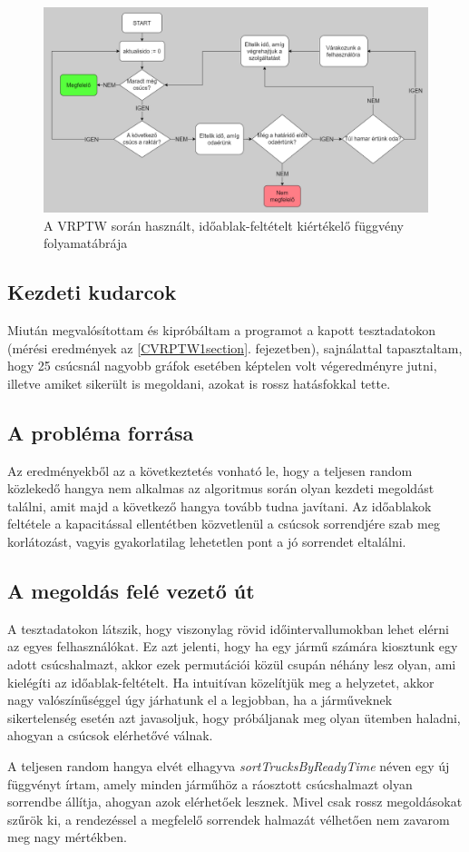\begin{figure}[ht!]
	\centering
	\includegraphics[width=150mm, keepaspectratio]{figures/timeWindow.drawio.png}
	\caption{A VRPTW során használt, időablak-feltételt kiértékelő függvény folyamatábrája}
	\label{fig:VRPTW_chart}
\end{figure}

\subsection{Kezdeti kudarcok}
Miután megvalósítottam és kipróbáltam a programot a kapott tesztadatokon (mérési eredmények az \ref{CVRPTW1section}. fejezetben), sajnálattal tapasztaltam, hogy 25 csúcsnál nagyobb gráfok esetében képtelen volt végeredményre jutni, illetve amiket sikerült is megoldani, azokat is rossz hatásfokkal tette.

\subsection{A probléma forrása} Az eredményekből az a következtetés vonható le, hogy a teljesen random közlekedő hangya nem alkalmas az algoritmus során olyan kezdeti megoldást találni, amit majd a következő hangya tovább tudna javítani. Az időablakok feltétele a kapacitással ellentétben közvetlenül a csúcsok sorrendjére szab meg korlátozást, vagyis gyakorlatilag lehetetlen pont a jó sorrendet eltalálni. 

\subsection{A megoldás felé vezető út}
A tesztadatokon látszik, hogy viszonylag rövid időintervallumokban lehet elérni az egyes felhasználókat. Ez azt jelenti, hogy ha egy jármű számára kiosztunk egy adott csúcshalmazt, akkor ezek permutációi közül csupán néhány lesz olyan, ami kielégíti az időablak-feltételt. Ha intuitívan közelítjük meg a helyzetet, akkor nagy valószínűséggel úgy járhatunk el a legjobban, ha a járműveknek sikertelenség esetén azt javasoljuk, hogy próbáljanak meg olyan ütemben haladni, ahogyan a csúcsok elérhetővé válnak.

\noindent
A teljesen random hangya elvét elhagyva \textit{\mbox{sortTrucksByReadyTime}} néven egy új függvényt írtam, amely minden járműhöz a ráosztott csúcshalmazt olyan sorrendbe állítja, ahogyan azok elérhetőek lesznek. Mivel csak rossz megoldásokat szűrök ki, a rendezéssel a megfelelő sorrendek halmazát vélhetően nem zavarom meg nagy mértékben.
